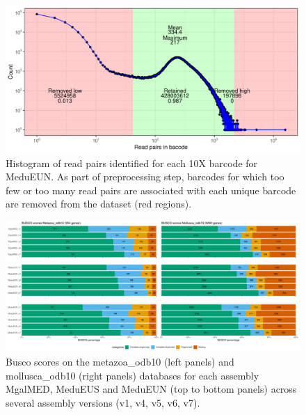 \documentclass[11pt, a4paper]{article}
\begin{document}
\begin{figure}[h]
	\includegraphics[width=\linewidth]{figures/MeduEUN_preproc_barcode_filt.pdf}
	\caption{Histogram of read pairs identified for each 10X barcode for MeduEUN.
	As part of preprocessing step, barcodes for which too few or too many read pairs are associated with each unique barcode are removed from the dataset (red regions).}
	\label{supfig:preproc_MeduEUN}
\end{figure}

\begin{figure}[h]
	\includegraphics[width=\linewidth]{figures/supfig_busco.pdf}
	\caption{Busco scores on the metazoa\_odb10 (left panels) and mollusca\_odb10 (right panels) databases for each assembly MgalMED, MeduEUS and MeduEUN (top to bottom panels) across several assembly versions (v1, v4, v5, v6, v7).}
	\label{supfig:busco}
\end{figure}
\end{document}

